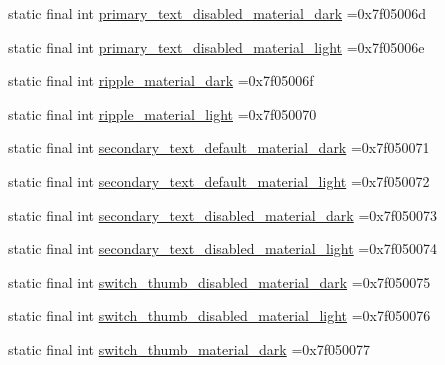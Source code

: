 \begin{DoxyCompactItemize}
static final int \mbox{\hyperlink{classbr_1_1unb_1_1cic_1_1mp_1_1marketmaster_1_1R_1_1color_aa3e6a064c13feb9c4c9fca061f625864}{primary\+\_\+text\+\_\+disabled\+\_\+material\+\_\+dark}} =0x7f05006d
\item 
static final int \mbox{\hyperlink{classbr_1_1unb_1_1cic_1_1mp_1_1marketmaster_1_1R_1_1color_aa2ef3af4e1a337e7947599a3501300ee}{primary\+\_\+text\+\_\+disabled\+\_\+material\+\_\+light}} =0x7f05006e
\item 
static final int \mbox{\hyperlink{classbr_1_1unb_1_1cic_1_1mp_1_1marketmaster_1_1R_1_1color_ad31a1283c5d708c9b235bd8fa6e8e170}{ripple\+\_\+material\+\_\+dark}} =0x7f05006f
\item 
static final int \mbox{\hyperlink{classbr_1_1unb_1_1cic_1_1mp_1_1marketmaster_1_1R_1_1color_ab006170650b199a3d5b25e2a939cacce}{ripple\+\_\+material\+\_\+light}} =0x7f050070
\item 
static final int \mbox{\hyperlink{classbr_1_1unb_1_1cic_1_1mp_1_1marketmaster_1_1R_1_1color_ad05607dd0b42fb80a5117c99e8d774fb}{secondary\+\_\+text\+\_\+default\+\_\+material\+\_\+dark}} =0x7f050071
\item 
static final int \mbox{\hyperlink{classbr_1_1unb_1_1cic_1_1mp_1_1marketmaster_1_1R_1_1color_a8f4f7d9f02cc40dfeb2b37b47a43e34a}{secondary\+\_\+text\+\_\+default\+\_\+material\+\_\+light}} =0x7f050072
\item 
static final int \mbox{\hyperlink{classbr_1_1unb_1_1cic_1_1mp_1_1marketmaster_1_1R_1_1color_ae1b29fc7e27425dd00d1ad6d8efc8c46}{secondary\+\_\+text\+\_\+disabled\+\_\+material\+\_\+dark}} =0x7f050073
\item 
static final int \mbox{\hyperlink{classbr_1_1unb_1_1cic_1_1mp_1_1marketmaster_1_1R_1_1color_a43c3839e25454b6bbd579178c3ada486}{secondary\+\_\+text\+\_\+disabled\+\_\+material\+\_\+light}} =0x7f050074
\item 
static final int \mbox{\hyperlink{classbr_1_1unb_1_1cic_1_1mp_1_1marketmaster_1_1R_1_1color_a78f2952a1463a2bc5e5d8c6448386a90}{switch\+\_\+thumb\+\_\+disabled\+\_\+material\+\_\+dark}} =0x7f050075
\item 
static final int \mbox{\hyperlink{classbr_1_1unb_1_1cic_1_1mp_1_1marketmaster_1_1R_1_1color_a92cef906a35f380eabf183f719364aec}{switch\+\_\+thumb\+\_\+disabled\+\_\+material\+\_\+light}} =0x7f050076
\item 
static final int \mbox{\hyperlink{classbr_1_1unb_1_1cic_1_1mp_1_1marketmaster_1_1R_1_1color_ae9769f28357606860b7088f1f763fd83}{switch\+\_\+thumb\+\_\+material\+\_\+dark}} =0x7f050077
\item 

\end{DoxyCompactItemize}
